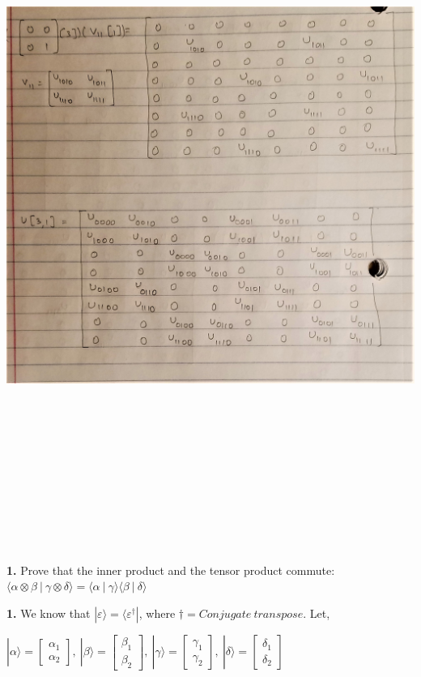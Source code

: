 \documentclass [12pt]{article}
\theoremstyle{definition}
\newcommand{\ket}[1]{| {#1} \rangle}
\newcommand{\bra}[1]{\langle {#1} |}
\newcommand{\braket}[2]{\langle #1 \ | \ #2 \rangle}
\newcommand{\tensor}[2]{ #1 \otimes  #2 }
\begin{document}
\includegraphics[width=18cm, height=23cm]{I44}

\newpage

{\bf 1.} Prove that the inner product and the tensor product commute: $\braket{\tensor{\alpha}{\beta}}{\tensor{\gamma}{\delta}} = \braket{\alpha}{\gamma} \braket{\beta}{\delta}$

\phantom{1em} {\bf 1.} We know that $\ket{\varepsilon} = \bra{\varepsilon^{\dag}}$, where $\dag = Conjugate \ transpose$. Let, 

\phantom{1000em} $\ket{\alpha} = \begin{bmatrix} \alpha_{1} \\ \alpha_{2}\end{bmatrix}, \ \ket{\beta} = \begin{bmatrix} \beta_{1} \\ \beta_{2}\end{bmatrix}, \ \ket{\gamma} = \begin{bmatrix} \gamma_{1} \\ \gamma_{2}\end{bmatrix}, \ \ket{\delta} = \begin{bmatrix} \delta_{1} \\ \delta_{2}\end{bmatrix}$
\end{document}
